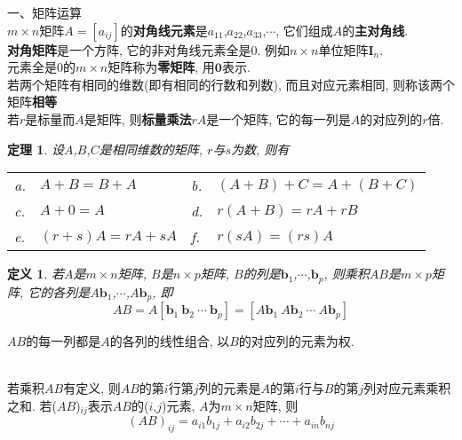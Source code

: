 \documentclass[UTF8,fontset=ubuntu]{ctexart}
\theoremstyle{plain}
\newtheorem{theorem}{定理}
\theoremstyle{nonumberplain}
\newtheorem{definition}{定义}
\theoremstyle{empty}
\begin{document}
一、矩阵运算\\[1ex]
$m\times n$矩阵$A=[a_{ij}]$的\textbf{对角线元素}是$a_{11}$,$a_{22}$,$a_{33}$,$\cdots$, 它们组成$A$的\textbf{主对角线}.\\

\textbf{对角矩阵}是一个方阵, 它的非对角线元素全是0. 例如$n\times n$单位矩阵$\bm{I}_n$.\\

元素全是0的$m\times n$矩阵称为\textbf{零矩阵}, 用$\bm{0}$表示.\\

若两个矩阵有相同的维数(即有相同的行数和列数), 而且对应元素相同, 则称该两个矩阵\textbf{相等}\\

若$r$是标量而$A$是矩阵, 则\textbf{标量乘法}$rA$是一个矩阵, 它的每一列是$A$的对应列的$r$倍.\\

\begin{theorem}
设$A$,$B$,$C$是相同维数的矩阵, $r$与$s$为数, 则有\\
\begin{tabular}{l@{\ }l@{\hspace{5em}}l@{\ }l}
a. & $A+B=B+A$ & b. & $(A+B)+C=A+(B+C)$\\
c. & $A+0=A$ & d. & $r(A+B)=rA+rB$\\
e. & $(r+s)A=rA+sA$ & f. & $r(sA)=(rs)A$
\end{tabular}
\end{theorem}\vspace{2ex}

\begin{definition}
若$A$是$m\times n$矩阵, $B$是$n\times p$矩阵, $B$的列是$\bm{b}_1$,$\cdots$,$\bm{b}_p$, 则乘积$AB$是$m\times p$矩阵, 它的各列是$A\bm{b}_1$,$\cdots$,$A\bm{b}_p$, 即
\[AB=A[\bm{b}_1\ \bm{b}_2\ \cdots\ \bm{b}_p]=[A\bm{b}_1\ A\bm{b}_2\ \cdots\ A\bm{b}_p]\]
\end{definition}\vspace{2ex}

\begin{law}
$AB$的每一列都是$A$的各列的线性组合, 以$B$的对应列的元素为权.
\end{law}\vspace{2ex}

\begin{law}[计算$AB$的行列法则]\ \\
若乘积$AB$有定义, 则$AB$的第$i$行第$j$列的元素是$A$的第$i$行与$B$的第$j$列对应元素乘积之和. 若($AB$)${}_{ij}$表示$AB$的($i$,$j$)元素, $A$为$m\times n$矩阵, 则
\[(AB)_{ij}=a_{i1}b_{1j}+a_{i2}b_{2j}+\cdots+a_{in}b_{nj}\]
\end{law}\vspace{2ex}
\end{document}

